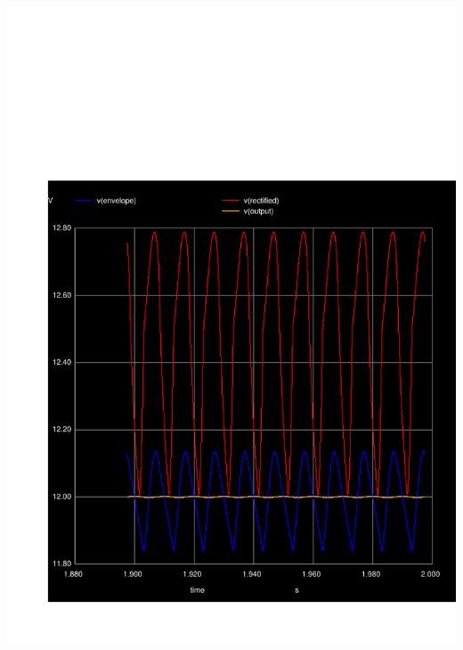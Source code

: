 \begin{minipage}[c]{0.50\linewidth}
\includegraphics[width=1\linewidth]{../sim/vout.pdf}
\end{minipage} %
\hspace{1mm}
